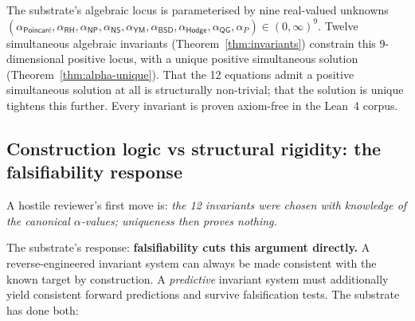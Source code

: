 \documentclass[11pt,a4paper]{amsart}
\theoremstyle{plain}
\theoremstyle{definition}
\begin{document}
The substrate's algebraic locus is parameterised by nine real-valued unknowns
$
(\alpha_{\textsf{Poincar\'e}}, \alpha_{\textsf{RH}}, \alpha_{\textsf{NP}}, \alpha_{\textsf{NS}}, \alpha_{\textsf{YM}}, \alpha_{\textsf{BSD}}, \alpha_{\textsf{Hodge}}, \alpha_{\textsf{QG}}, \alpha_{P}) \in (0,\infty)^9.
$
Twelve simultaneous algebraic invariants (Theorem~\ref{thm:invariants}) constrain this 9-dimensional positive locus, with a unique positive simultaneous solution (Theorem~\ref{thm:alpha-unique}). That the 12 equations admit a positive simultaneous solution at all is structurally non-trivial; that the solution is unique tightens this further. Every invariant is proven axiom-free in the Lean~4 corpus.

\subsection{Construction logic vs structural rigidity: the falsifiability response}\label{subsec:construction-vs-rigidity}

A hostile reviewer's first move is: \emph{the 12 invariants were chosen with knowledge of the canonical $\alpha$-values; uniqueness then proves nothing.}

The substrate's response: \textbf{falsifiability cuts this argument directly.} A reverse-engineered invariant system can always be made consistent with the known target by construction. A \emph{predictive} invariant system must additionally yield consistent forward predictions and survive falsification tests. The substrate has done both:
\end{document}
